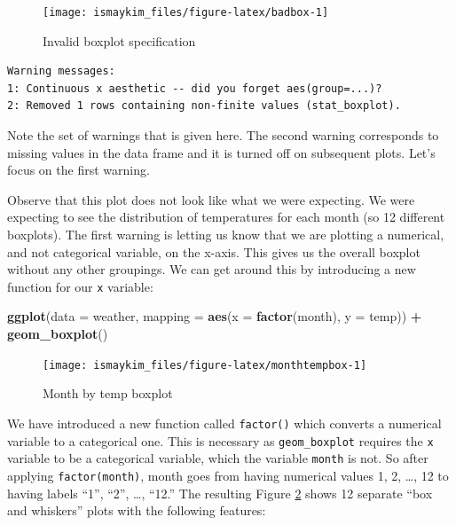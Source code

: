 \documentclass[12pt,]{krantz}
\makeatletter
\newenvironment{Shaded}{\begin{snugshade}}{\end{snugshade}}
\newcommand{\KeywordTok}[1]{\textcolor[rgb]{0.27,0.27,0.27}{\textbf{#1}}}
\newcommand{\DataTypeTok}[1]{\textcolor[rgb]{0.27,0.27,0.27}{#1}}
\newcommand{\StringTok}[1]{\textcolor[rgb]{0.5,0.5,0.5}{#1}}
\newcommand{\OperatorTok}[1]{\textcolor[rgb]{0.43,0.43,0.43}{\textbf{#1}}}
\newcommand{\NormalTok}[1]{#1}
\newenvironment{kframe}{%
\medskip{}
\setlength{\fboxsep}{.8em}
 \def\at@end@of@kframe{}%
 \ifinner\ifhmode%
  \def\at@end@of@kframe{\end{minipage}}%
  \begin{minipage}{\columnwidth}%
 \fi\fi%
 \def\FrameCommand##1{\hskip\@totalleftmargin \hskip-\fboxsep
 \colorbox{shadecolor}{##1}\hskip-\fboxsep
     \hskip-\linewidth \hskip-\@totalleftmargin \hskip\columnwidth}%
 \MakeFramed {\advance\hsize-\width
   \@totalleftmargin\z@ \linewidth\hsize
   \@setminipage}}%
 {\par\unskip\endMakeFramed%
 \at@end@of@kframe}
\renewenvironment{Shaded}{\begin{kframe}}{\end{kframe}}
\makeatother
\begin{document}
\begin{figure}

{\centering \texttt{[image: ismaykim\_files/figure-latex/badbox-1]} 

}

\caption{Invalid boxplot specification}\label{fig:badbox}
\end{figure}

\begin{verbatim}
Warning messages:
1: Continuous x aesthetic -- did you forget aes(group=...)? 
2: Removed 1 rows containing non-finite values (stat_boxplot). 
\end{verbatim}

Note the set of warnings that is given here. The second warning
corresponds to missing values in the data frame and it is turned off on
subsequent plots. Let's focus on the first warning.

Observe that this plot does not look like what we were expecting. We
were expecting to see the distribution of temperatures for each month
(so 12 different boxplots). The first warning is letting us know that we
are plotting a numerical, and not categorical variable, on the x-axis.
This gives us the overall boxplot without any other groupings. We can
get around this by introducing a new function for our \texttt{x}
variable:

\begin{Shaded}
\begin{Highlighting}[]
\KeywordTok{ggplot}\NormalTok{(}\DataTypeTok{data =}\NormalTok{ weather, }\DataTypeTok{mapping =} \KeywordTok{aes}\NormalTok{(}\DataTypeTok{x =} \KeywordTok{factor}\NormalTok{(month), }\DataTypeTok{y =}\NormalTok{ temp)) }\OperatorTok{+}
\StringTok{  }\KeywordTok{geom_boxplot}\NormalTok{()}
\end{Highlighting}
\end{Shaded}

\begin{figure}

{\centering \texttt{[image: ismaykim\_files/figure-latex/monthtempbox-1]} 

}

\caption{Month by temp boxplot}\label{fig:monthtempbox}
\end{figure}

We have introduced a new function called \texttt{factor()} which
converts a numerical variable to a categorical one. This is necessary as
\texttt{geom\_boxplot} requires the \texttt{x} variable to be a
categorical variable, which the variable \texttt{month} is not. So after
applying \texttt{factor(month)}, month goes from having numerical values
1, 2, \ldots{}, 12 to having labels ``1'', ``2'', \ldots{}, ``12.'' The
resulting Figure \ref{fig:monthtempbox} shows 12 separate ``box and
whiskers'' plots with the following features:
\end{document}
